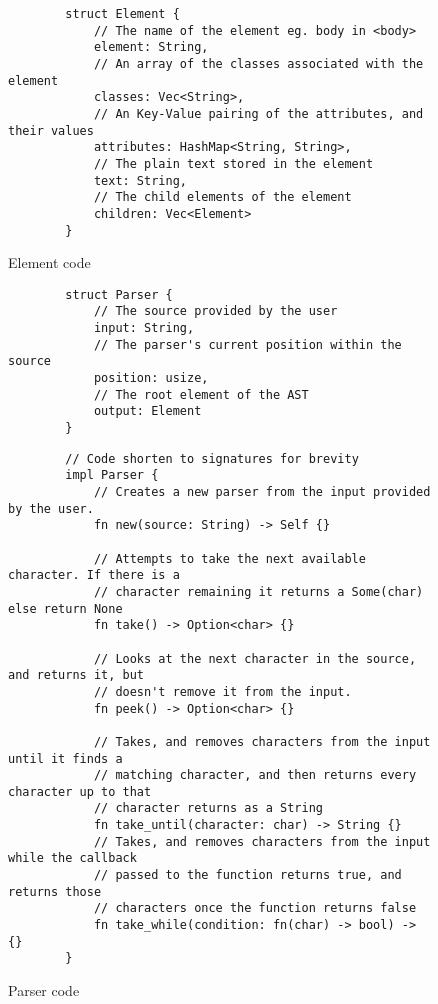 \begin{figure}[ht!]
    \begin{verbatim}
        struct Element {
            // The name of the element eg. body in <body>
            element: String,
            // An array of the classes associated with the element
            classes: Vec<String>,
            // An Key-Value pairing of the attributes, and their values
            attributes: HashMap<String, String>,
            // The plain text stored in the element
            text: String,
            // The child elements of the element
            children: Vec<Element>
        }
    \end{verbatim}
    \caption{Element code}
\end{figure}

\begin{figure}[ht!]
    \begin{verbatim}
        struct Parser {
            // The source provided by the user
            input: String,
            // The parser's current position within the source
            position: usize,
            // The root element of the AST
            output: Element
        }
    \end{verbatim}
    \newpage
    \begin{verbatim}
        // Code shorten to signatures for brevity
        impl Parser {
            // Creates a new parser from the input provided by the user.
            fn new(source: String) -> Self {}

            // Attempts to take the next available character. If there is a
            // character remaining it returns a Some(char) else return None
            fn take() -> Option<char> {}

            // Looks at the next character in the source, and returns it, but
            // doesn't remove it from the input.
            fn peek() -> Option<char> {}

            // Takes, and removes characters from the input until it finds a 
            // matching character, and then returns every character up to that
            // character returns as a String
            fn take_until(character: char) -> String {}
            // Takes, and removes characters from the input while the callback
            // passed to the function returns true, and returns those 
            // characters once the function returns false
            fn take_while(condition: fn(char) -> bool) -> {}
        }
    \end{verbatim}
    \caption{Parser code}
\end{figure}